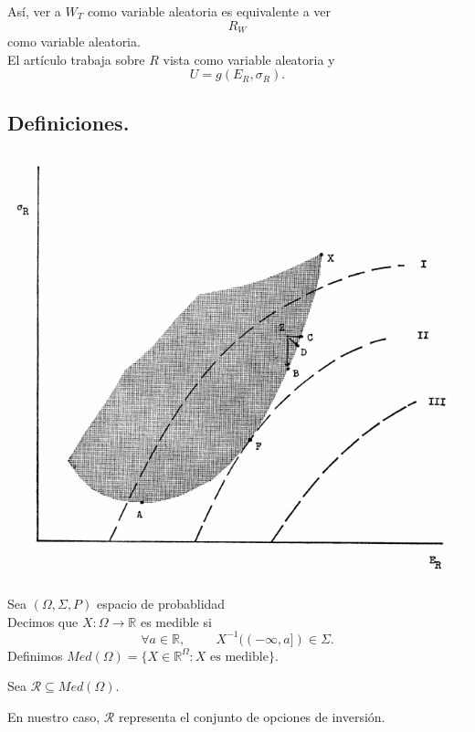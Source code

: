 \documentclass{beamer}
\begin{document}
\begin{frame}[t,fragile]
	\frametitle{\subsecname}
	\begin{block}{\centering }
		Así, ver a \(W_T\) como variable aleatoria es equivalente a ver 
		\[
			R_W
		\]
		como variable aleatoria. \\ 
		El artículo trabaja sobre \(R\) vista como variable aleatoria y
		\[
			U = g(E_R, \sigma _R).
		\]
	\end{block}
\end{frame}

\subsection{Definiciones.} %
\begin{frame}[t,fragile]
	\frametitle{\subsecname}
	\includegraphics[width= 0.75 \linewidth, page = 1]{IMAGES/1/2}
\end{frame}

\begin{frame}[t,fragile]
	\frametitle{\subsecname}
	\begin{definition}
		Sea \((\Omega , \Sigma , P)\) espacio de probablidad \\
		\pause
		Decimos que \(X: \Omega \longrightarrow \mathbb{R}\) es medible si
		\[
			\forall a \in \mathbb{R} , \hspace{1cm} 
			X^ {-1} ((- \infty ,a]) \in \Sigma.
		\]
		\pause
		Definimos
		\(Med(\Omega) = 
		\{X \in \mathbb{R} ^ \Omega : X \mbox{ es medible}\}\).
	\end{definition}
	\pause
	\begin{definition}
		Sea \(\mathscr{R} \subseteq Med(\Omega)\).
	\end{definition}
	\pause
	En nuestro caso,
	\(\mathscr{R}\) representa el conjunto de opciones de inversión.
\end{frame}
\end{document}
